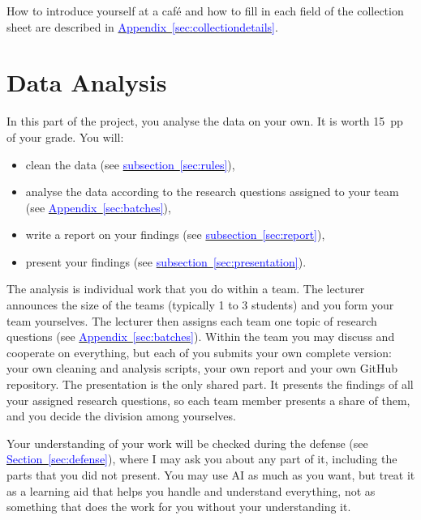 \documentclass[11pt,a4paper]{article}
\begin{document}
How to introduce yourself at a caf\'e and how to fill in each field of the collection sheet are described in \hyperref[sec:collectiondetails]{\textcolor{blue}{Appendix~\ref*{sec:collectiondetails}}}.

\clearpage
\section{Data Analysis}\label{sec:analysis}

In this part of the project, you analyse the data on your own. It is worth 15~pp of your grade.  You will:

\begin{itemize}
	\item clean the data (see \hyperref[sec:rules]{\textcolor{blue}{subsection~\ref*{sec:rules}}}),
	\item analyse the data according to the research questions assigned to your team (see \hyperref[sec:batches]{\textcolor{blue}{Appendix~\ref*{sec:batches}}}),
	\item write a report on your findings (see \hyperref[sec:report]{\textcolor{blue}{subsection~\ref*{sec:report}}}),
	\item present your findings (see \hyperref[sec:presentation]{\textcolor{blue}{subsection~\ref*{sec:presentation}}}).
\end{itemize}

The analysis is individual work that you do within a team. The lecturer announces the size of the teams (typically 1 to 3 students) and you form your team yourselves. The lecturer then assigns each team one topic of research questions (see \hyperref[sec:batches]{\textcolor{blue}{Appendix~\ref*{sec:batches}}}). Within the team you may discuss and cooperate on everything, but each of you submits your own complete version: your own cleaning and analysis scripts, your own report and your own GitHub repository. The presentation is the only shared part. It presents the findings of all your assigned research questions, so each team member presents a share of them, and you decide the division among yourselves.

Your understanding of your work will be checked during the defense (see \hyperref[sec:defense]{\textcolor{blue}{Section~\ref*{sec:defense}}}), where I may ask you about any part of it, including the parts that you did not present. You may use AI as much as you want, but treat it as a learning aid that helps you handle and understand everything, not as something that does the work for you without your understanding it.
\end{document}
